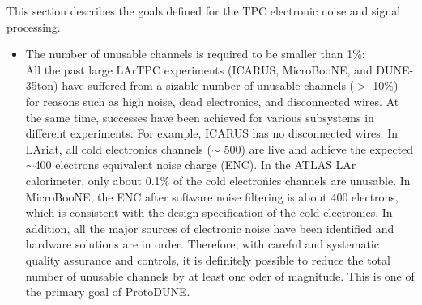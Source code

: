 This section describes the goals defined for the TPC electronic noise and signal processing.
\begin{itemize}
\item The number of unusable channels is required to be smaller than 1\%: \\
All the past large LArTPC experiments (ICARUS, MicroBooNE, and DUNE-35ton) have suffered from a sizable
number of unusable channels ($>$ 10\%) for %
reasons such as high noise, dead electronics, 
and disconnected wires. At the same time, successes have been achieved for various subsystems in 
different experiments. 
For example, ICARUS has no disconnected wires. In LAriat, all 
cold electronics channels ($\sim$ 500) are live and achieve the expected $\sim$400 electrons equivalent 
noise charge (ENC). In the ATLAS LAr calorimeter, only about 0.1\% of the cold electronics channels are unusable. 
In MicroBooNE, the ENC after software noise filtering is about 400 electrons, which is consistent with 
the design specification of the cold electronics. In addition, all the major sources of electronic noise
have been identified and hardware solutions are in order. Therefore, with careful and systematic 
quality assurance and controls, it is definitely possible to reduce the total number of unusable channels
by at least one oder of magnitude. This is one of the primary goal of ProtoDUNE.



\end{itemize}
